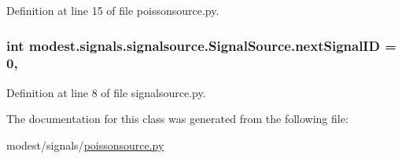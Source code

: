 Definition at line 15 of file poissonsource.\+py.

\subsubsection[{\texorpdfstring{next\+Signal\+ID}{nextSignalID}}]{\setlength{\rightskip}{0pt plus 5cm}int modest.\+signals.\+signalsource.\+Signal\+Source.\+next\+Signal\+ID = 0\hspace{0.3cm}{\ttfamily [static]}, {\ttfamily [inherited]}}\hypertarget{classmodest_1_1signals_1_1signalsource_1_1SignalSource_a453eafb550b551adbec0903deb63dfce}{}\label{classmodest_1_1signals_1_1signalsource_1_1SignalSource_a453eafb550b551adbec0903deb63dfce}


Definition at line 8 of file signalsource.\+py.



The documentation for this class was generated from the following file\+:\begin{DoxyCompactItemize}
\item 
modest/signals/\hyperlink{poissonsource_8py}{poissonsource.\+py}\end{DoxyCompactItemize}
